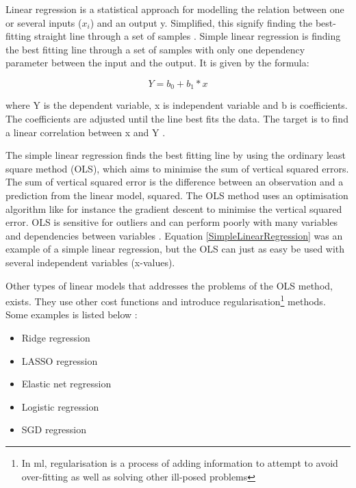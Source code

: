 \documentclass[english, a4paper]{report}
\begin{document}
{{{            Linear regression is a statistical approach for modelling the relation between one or several inputs ($x_i$) and an output y.  Simplified, this signify finding the best-fitting straight line through a set of samples \cite{pythonML}. Simple linear regression is finding the best fitting line through a set of samples with only one dependency parameter between the input and the output. It is given by the formula:
            
            \begin{equation}\label{SimpleLinearRegression}
                Y=b_0 + b_1 * x
            \end{equation}
            
            where Y is the dependent variable, x is independent variable and b is coefficients. The coefficients are adjusted until the line best fits the data. The target is to find a linear correlation between x and Y \cite{pythonML}.
            \par
            The simple linear regression finds the best fitting line by using the ordinary least square method (OLS), which aims to minimise the sum of vertical squared errors.  The sum of vertical squared error is the difference between an observation and a prediction from the linear model, squared. The OLS method uses an optimisation algorithm like for instance the gradient descent to minimise the vertical squared error. OLS is sensitive for outliers and can perform poorly with many variables and dependencies between variables \cite{scikitGeneralisedLinMod}. Equation \ref{SimpleLinearRegression} was an example of a simple linear regression, but the OLS can just as easy be used with several independent variables (x-values).
            \par
            Other types of linear models that addresses the problems of the OLS method, exists. They use other cost functions and introduce regularisation\footnote{In \gls{ml}, regularisation is a process of adding information to attempt to avoid over-fitting as well as solving other ill-posed problems} methods. Some examples is listed below \cite{scikitGeneralisedLinMod}:
            \begin{itemize}
                \item Ridge regression
                \item LASSO regression
                \item Elastic net regression
                \item Logistic regression
                \item SGD regression
            \end{itemize}
            
}}}
\end{document}
